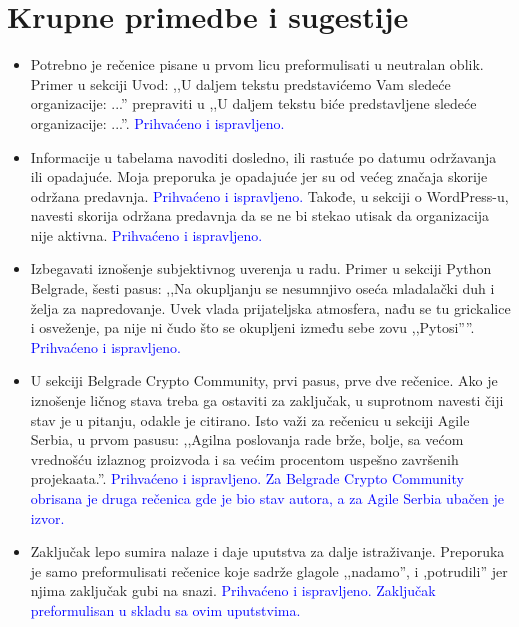 \documentclass[a4paper]{report}
\newcommand{\odgovor}[1]{\textcolor{blue}{#1}}
\begin{document}
\section{Krupne primedbe i sugestije}
\begin{itemize}
    \item Potrebno je rečenice pisane u prvom licu  preformulisati u neutralan oblik. 
    Primer u sekciji Uvod: ,,U daljem tekstu predstavićemo Vam sledeće organizacije: ...'' prepraviti u ,,U daljem tekstu biće predstavljene sledeće organizacije: ...''.
    \odgovor{Prihvaćeno i ispravljeno.}
    \item Informacije u tabelama navoditi dosledno, ili rastuće po datumu održavanja ili opadajuće. Moja preporuka je opadajuće jer su od većeg značaja skorije održana predavnja. 
    \odgovor{Prihvaćeno i ispravljeno.}
    Takođe, u sekciji o WordPress-u, navesti skorija održana predavnja da se ne bi stekao utisak da organizacija nije aktivna. \odgovor{Prihvaćeno i ispravljeno.}
    \item Izbegavati iznošenje subjektivnog uverenja u radu.
    Primer u sekciji Python Belgrade, šesti pasus: ,,Na okupljanju se nesumnjivo oseća mladalački duh i želja za napredovanje. Uvek vlada prijateljska atmosfera, nađu se tu grickalice i osveženje, pa nije ni čudo što se okupljeni između sebe zovu ,,Pytosi''''.
    \odgovor{Prihvaćeno i ispravljeno.}
    \item U sekciji Belgrade Crypto Community, prvi pasus, prve dve rečenice. Ako je iznošenje ličnog stava treba ga ostaviti za zaključak, u suprotnom navesti čiji stav je u pitanju, odakle je citirano. Isto važi za rečenicu u sekciji Agile Serbia, u prvom pasusu: ,,Agilna poslovanja rade brže, bolje, sa većom vrednošću izlaznog proizvoda i sa većim procentom uspešno završenih projekaata.''. 
    \odgovor{Prihvaćeno i ispravljeno. Za Belgrade Crypto Community obrisana je druga rečenica gde je bio stav autora, a za Agile Serbia ubačen je izvor.}
    \item Zaključak lepo sumira nalaze i daje uputstva za dalje istraživanje. Preporuka je samo preformulisati rečenice koje sadrže glagole ,,nadamo'', i ,potrudili'' jer njima zaključak gubi na snazi.
    \odgovor{Prihvaćeno i ispravljeno. Zaključak preformulisan u skladu sa ovim uputstvima.}
    
\end{itemize}{}
\end{document}
